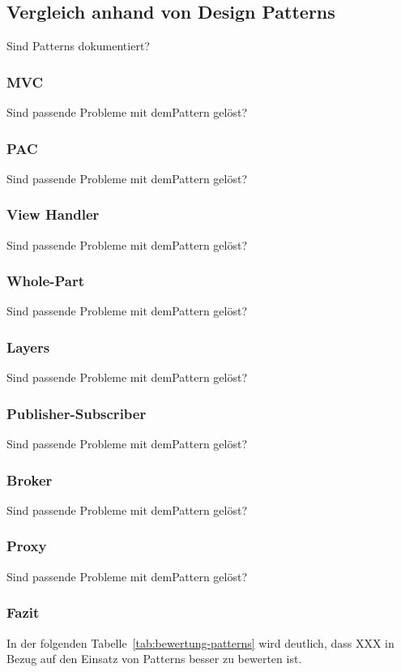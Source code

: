 \color{red}

\subsection{Vergleich anhand von Design Patterns}
Sind Patterns dokumentiert?

\subsubsection{MVC}
Sind passende Probleme mit demPattern gelöst?

\subsubsection{PAC}
Sind passende Probleme mit demPattern gelöst?

\subsubsection{View Handler}
Sind passende Probleme mit demPattern gelöst?

\subsubsection{Whole-Part}
Sind passende Probleme mit demPattern gelöst?

\subsubsection{Layers}
Sind passende Probleme mit demPattern gelöst?

\subsubsection{Publisher-Subscriber}
Sind passende Probleme mit demPattern gelöst?

\subsubsection{Broker}
Sind passende Probleme mit demPattern gelöst?

\subsubsection{Proxy}
Sind passende Probleme mit demPattern gelöst?

\subsubsection{Fazit}
In der folgenden Tabelle~\ref{tab:bewertung-patterns} wird deutlich, dass XXX in Bezug auf den Einsatz von Patterns besser zu bewerten ist.

